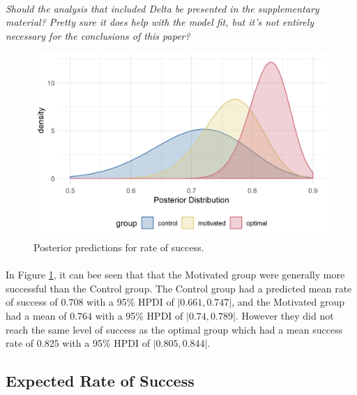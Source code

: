 \documentclass[12pt]{article}
\begin{document}
\paragraph{} \textit{Should the analysis that included Delta be presented in the supplementary material? Pretty sure it does help with the model fit, but it's not entirely necessary for the conclusions of this paper?}

\begin{figure}[ht!]
	\includegraphics[scale=1]{../Figures/Model_stan_rawacc.png}
	\centering
	\captionsetup{justification=centering}
	\caption{Posterior predictions for rate of success.}
	\label{fig:Model_raw_acc}
\end{figure}

\paragraph{} In Figure \ref{fig:Model_raw_acc}, it can bee seen that that the Motivated group were generally more successful than the Control group. The Control group had a predicted mean rate of success of $0.708$ with a 95\% HPDI of $|0.661, 0.747|$, and the Motivated group had a mean of $0.764$ with a 95\% HPDI of $|0.74, 0.789|$. However they did not reach the same level of success as the optimal group which had a mean success rate of $0.825$ with a 95\% HPDI of $|0.805, 0.844|$. 


\subsection*{Expected Rate of Success}
\end{document}
